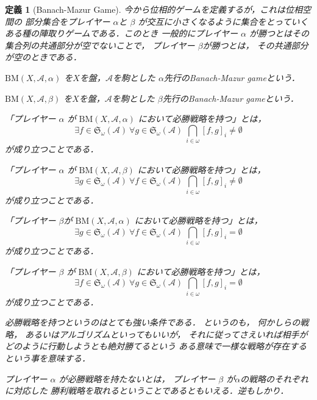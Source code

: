 \documentclass[leqno, 12pt]{jsarticle}
\newtheorem{df}[thm]{定義}
\newcommand{\mycal}[1]{\mathcal{#1}}
\newcommand{\mysen}[2]{\mathfrak{S}_{#1}(#2)}
\newcommand{\myka}[3]{[#1, #2]_{#3}}
\newcommand{\mybm}[3]{\mathrm{BM}(#1, #2, #3)}
\newcommand{\myom}{\omega}
\begin{document}
\begin{df}[Banach-Mazur Game]
今から位相的ゲームを定義するが，これは位相空間の
部分集合をプレイヤー
$\alpha$と
$\beta$
が交互に小さくなるように集合をとっていくある種の陣取りゲームである．このとき
一般的にプレイヤー
$\alpha$
が勝つとはその集合列の共通部分が空でないことで，
プレイヤー
$\beta$が勝つとは，
その共通部分が空のときである．

$\mybm{X}{\mycal{A}}{\alpha}$
を$X$を盤，$\mathcal{A}$を駒とした
$\alpha$先行のBanach-Mazur gameという．


$\mybm{X}{\mycal{A}}{\beta}$
を$X$を盤，$\mathcal{A}$を駒とした
$\beta$先行のBanach-Mazur gameという．



「プレイヤー
$\alpha$
が
$\mybm{X}{\mycal{A}}{\alpha}$
において必勝戦略を持つ」とは，
\[
\exists f\in 
\mysen{\myom}{\mycal{A}}
\ \forall g\in 
\mysen{\myom}{\mycal{A}}
\ 
\bigcap_{i\in \myom}\myka{f}{g}{i}\neq \emptyset
\]
が成り立つことである．

「プレイヤー
$\alpha$
が
$\mybm{X}{\mycal{A}}{\beta}$
において必勝戦略を持つ」とは，
\[
\exists g\in 
\mysen{\myom}{\mycal{A}}
\ \forall f\in 
\mysen{\myom}{\mycal{A}}
\ 
\bigcap_{i\in \myom}
\myka{f}{g}{i}
\neq \emptyset
\]
が成り立つことである．

「プレイヤー
$\beta$が
$\mybm{X}{\mycal{A}}{\alpha}$
において必勝戦略を持つ」とは，
\[
\exists g\in 
\mysen{\myom}{\mycal{A}}
\ \forall f\in 
\mysen{\myom}{\mycal{A}}
\ 
\bigcap_{i\in \myom}
\myka{f}{g}{i}
=\emptyset
\]
が成り立つことである．

「プレイヤー
$\beta$
が
$\mybm{X}{\mycal{A}}{\beta}$
において必勝戦略を持つ」とは，
\[
\exists f\in 
\mysen{\myom}{\mycal{A}}
\ \forall g\in 
\mysen{\myom}{\mycal{A}}
\ 
\bigcap_{i\in \myom}
\myka{f}{g}{i}
=
\emptyset
\]
が成り立つことである．


必勝戦略を持つというのはとても強い条件である．
というのも，
何かしらの戦略，
あるいはアルゴリズムといってもいいが，
それに従ってさえいれば相手がどのように行動しようとも絶対勝てるという
ある意味で一様な戦略が存在するという事を意味する．


プレイヤー
$\alpha$
が必勝戦略を持たないとは，
プレイヤー
$\beta$
が$\alpha$の戦略のそれぞれに対応した
勝利戦略を取れるということであるともいえる．逆もしかり．



\end{df}
\end{document}
